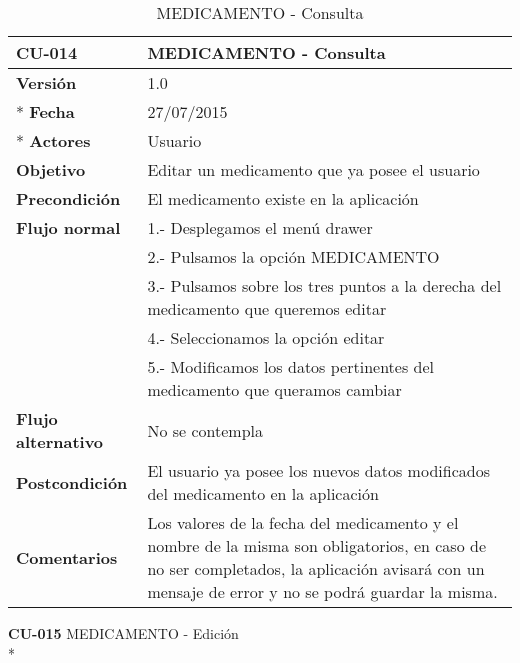 \documentclass[../pfc.tex]{subfiles}
\begin{document}
		\begin{table}[H]
			\centering
			\begin{tabular}[t]{|p{3cm}|p{9.5cm}|}
				\hline \textbf{CU-014} & \textbf{MEDICAMENTO - Consulta} \\*
				\hline\hline \textbf{Versión} & 1.0 \\ *
				\hline\hline \textbf{Fecha} & 27/07/2015 \\ *
				\hline\textbf{Actores} 	& Usuario\\*
				\hline \textbf{Objetivo} & Editar un medicamento que ya posee el usuario\\* 			
				\hline \textbf{Precondición} & El medicamento existe en la aplicación\\* 
				\hline \textbf{Flujo normal} & 1.- Desplegamos el menú drawer \\* 
				& 2.- Pulsamos la opción MEDICAMENTO\\*	
				& 3.- Pulsamos sobre los tres puntos a la derecha del medicamento que queremos editar\\*	
				& 4.- Seleccionamos la opción editar\\*	
				& 5.- Modificamos los datos pertinentes del medicamento que queramos cambiar\\*	
				\hline \textbf{Flujo alternativo} & No se contempla \\* 
				\hline \textbf{Postcondición} & El usuario ya posee los nuevos datos modificados del medicamento en la aplicación \\* 
				\hline \textbf{Comentarios}   & Los valores de la fecha del medicamento y el nombre de la misma son obligatorios, en caso de no ser completados, la aplicación avisará con un mensaje de error y no se podrá guardar la misma.\\*
				\hline
			\end{tabular}
			\caption{MEDICAMENTO - Consulta}
			\label{tabla:caso014}
		\end{table}
		
		
		
		
		\textbf{CU-015}	MEDICAMENTO - Edición\\*
		
\end{document}
